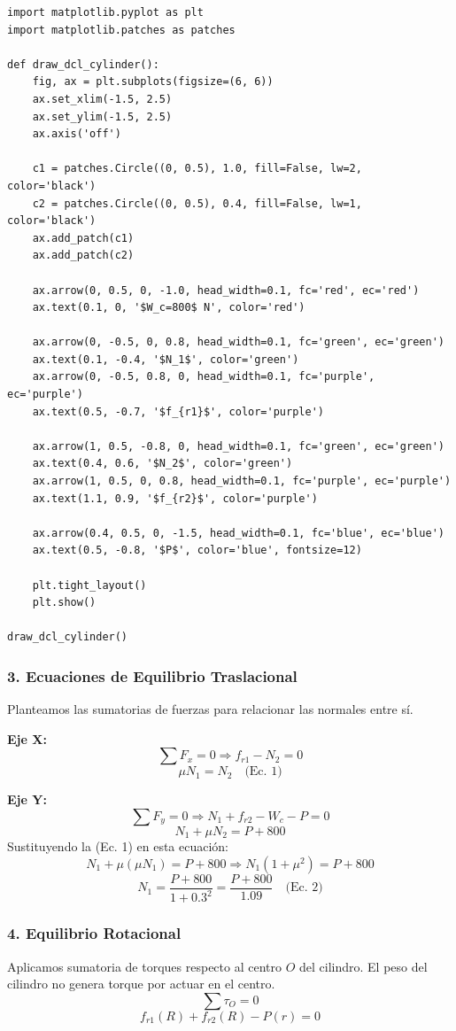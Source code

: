 \documentclass[12pt, a4paper]{article}
\begin{document}
\begin{lstlisting}
import matplotlib.pyplot as plt
import matplotlib.patches as patches

def draw_dcl_cylinder():
    fig, ax = plt.subplots(figsize=(6, 6))
    ax.set_xlim(-1.5, 2.5)
    ax.set_ylim(-1.5, 2.5)
    ax.axis('off')

    c1 = patches.Circle((0, 0.5), 1.0, fill=False, lw=2, color='black')
    c2 = patches.Circle((0, 0.5), 0.4, fill=False, lw=1, color='black')
    ax.add_patch(c1)
    ax.add_patch(c2)

    ax.arrow(0, 0.5, 0, -1.0, head_width=0.1, fc='red', ec='red')
    ax.text(0.1, 0, '$W_c=800$ N', color='red')

    ax.arrow(0, -0.5, 0, 0.8, head_width=0.1, fc='green', ec='green')
    ax.text(0.1, -0.4, '$N_1$', color='green')
    ax.arrow(0, -0.5, 0.8, 0, head_width=0.1, fc='purple', ec='purple')
    ax.text(0.5, -0.7, '$f_{r1}$', color='purple')

    ax.arrow(1, 0.5, -0.8, 0, head_width=0.1, fc='green', ec='green')
    ax.text(0.4, 0.6, '$N_2$', color='green')
    ax.arrow(1, 0.5, 0, 0.8, head_width=0.1, fc='purple', ec='purple')
    ax.text(1.1, 0.9, '$f_{r2}$', color='purple')

    ax.arrow(0.4, 0.5, 0, -1.5, head_width=0.1, fc='blue', ec='blue')
    ax.text(0.5, -0.8, '$P$', color='blue', fontsize=12)

    plt.tight_layout()
    plt.show()

draw_dcl_cylinder()
\end{lstlisting}

\subsubsection*{3. Ecuaciones de Equilibrio Traslacional}
Planteamos las sumatorias de fuerzas para relacionar las normales entre sí.

\textbf{Eje X:}
$$\sum F_x = 0 \Rightarrow f_{r1} - N_2 = 0$$
$$\mu N_1 = N_2 \quad \text{(Ec. 1)}$$

\textbf{Eje Y:}
$$\sum F_y = 0 \Rightarrow N_1 + f_{r2} - W_c - P = 0$$
$$N_1 + \mu N_2 = P + 800$$
Sustituyendo la (Ec. 1) en esta ecuación:
$$N_1 + \mu(\mu N_1) = P + 800 \Rightarrow N_1(1 + \mu^2) = P + 800$$
$$N_1 = \frac{P + 800}{1 + 0.3^2} = \frac{P + 800}{1.09} \quad \text{(Ec. 2)}$$

\subsubsection*{4. Equilibrio Rotacional}
Aplicamos sumatoria de torques respecto al centro $O$ del cilindro. El peso del cilindro no genera torque por actuar en el centro.
$$\sum \tau_O = 0$$
$$f_{r1}(R) + f_{r2}(R) - P(r) = 0$$
\end{document}
